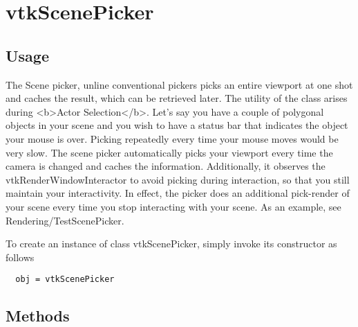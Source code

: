 \section{vtkScenePicker}

\subsection{Usage}

 The Scene picker, unline conventional pickers picks an entire viewport at
 one shot and caches the result, which can be retrieved later. 
    The utility of the class arises during <b>Actor Selection</b>. Let's 
 say you have a couple of polygonal objects in your scene and you wish to 
 have a status bar that indicates the object your mouse is over. Picking
 repeatedly every time your mouse moves would be very slow. The 
 scene picker automatically picks your viewport every time the camera is
 changed and caches the information. Additionally, it observes the 
 vtkRenderWindowInteractor to avoid picking during interaction, so that
 you still maintain your interactivity. In effect, the picker does an
 additional pick-render of your scene every time you stop interacting with
 your scene. As an example, see Rendering/TestScenePicker.
 

To create an instance of class vtkScenePicker, simply
invoke its constructor as follows
\begin{verbatim}
  obj = vtkScenePicker
\end{verbatim}
\subsection{Methods}

